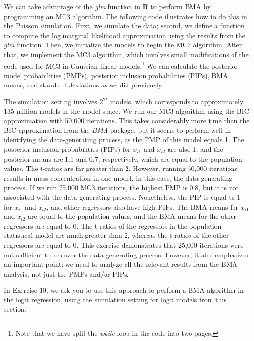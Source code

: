 We can take advantage of the \textit{glm} function in \textbf{R} to perform BMA by programming an MC3 algorithm. The following code illustrates how to do this in the Poisson simulation. First, we simulate the data; second, we define a function to compute the log marginal likelihood approximation using the results from the \textit{glm} function. Then, we initialize the models to begin the MC3 algorithm. After that, we implement the MC3 algorithm, which involves small modifications of the code used for MC3 in Gaussian linear models.\footnote{Note that we have split the \textit{while} loop in the code into two pages.} We can calculate the posterior model probabilities (PMPs), posterior inclusion probabilities (PIPs), BMA means, and standard deviations as we did previously.

The simulation setting involves $2^{27}$ models, which corresponds to approximately 135 million models in the model space. We run our MC3 algorithm using the BIC approximation with 50,000 iterations. This takes considerably more time than the BIC approximation from the \textit{BMA} package, but it seems to perform well in identifying the data-generating process, as the PMP of this model equals 1. The posterior inclusion probabilities (PIPs) for $x_{i1}$ and $x_{i2}$ are also 1, and the posterior means are 1.1 and 0.7, respectively, which are equal to the population values. The t-ratios are far greater than 2. However, running 50,000 iterations results in mass concentration in one model, in this case, the data-generating process. If we run 25,000 MC3 iterations, the highest PMP is 0.8, but it is not associated with the data-generating process. Nonetheless, the PIP is equal to 1 for $x_{i1}$ and $x_{i2}$, and other regressors also have high PIPs. The BMA means for $x_{i1}$ and $x_{i2}$ are equal to the population values, and the BMA means for the other regressors are equal to 0. The t-ratios of the regressors in the population statistical model are much greater than 2, whereas the t-ratios of the other regressors are equal to 0. This exercise demonstrates that 25,000 iterations were not sufficient to uncover the data-generating process. However, it also emphasizes an important point: we need to analyze all the relevant results from the BMA analysis, not just the PMPs and/or PIPs.

In Exercise 10, we ask you to use this approach to perform a BMA algorithm in the logit regression, using the simulation setting for logit models from this section.

